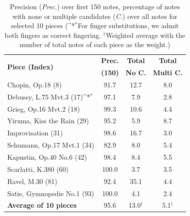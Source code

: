 \documentclass{article}
\begin{document}
\begin{table}
\def\sym#1{\ifmmode^{#1}\else\(^{#1}\)\fi}
\centering
\small

\begin{center}
\begin{tabular*}{\columnwidth}{l@{\extracolsep{\fill}}ccc}
\toprule
\multirow{2}{*}{\textbf{Piece (Index)}} &  \textbf{Prec.} & \textbf{Total}  & \textbf{Total} \\                                     &  \textbf{(150)} & \textbf{No C.} & \textbf{Multi C.}\\
\midrule
Chopin, Op.18 (8) &  91.7 & 12.7 & 8.0 \\
Debussy, L.75 Mvt.3 (17)\sym{*} & 97.1 & 7.9 & 2.8 \\
Grieg, Op.16 Mvt.2 (18) & 99.3 & 10.6 & 4.4 \\
Yiruma, Kiss the Rain (29) & 95.2 & 5.9 & 8.7 \\
Improvisation (31) & 98.6 & 16.7 & 3.0 \\
Schumann, Op.17 Mvt.1 (34) & 82.9 & 8.0 & 5.4 \\
Kapustin, Op.40 No.6 (42) & 98.4 & 8.4 & 5.5 \\
Scarlatti, K.380 (60) & 100.0 & 3.7 & 3.5 \\
Ravel, M.30 (81) & 92.4 & 35.1 & 4.4 \\
Satie, Gymnopedie No.1 (93) & 100.0 & 4.1 & 2.4 \\ 
\midrule
\textbf{Average of 10 pieces} & 95.6 & 13.0$^\dagger$ & 5.1$^\dagger$
\\
\bottomrule
\end{tabular*}
\caption{Precision (\textit{Prec.}) over first 150 notes, percentage of notes with none or multiple candidates (\textit{C.}) over all notes for selected 10 pieces (\sym{*}For finger substitutions, we admit both fingers as correct fingering. $^\dagger$Weighted average with the number of total notes of each piece as the weight.)}
\label{tab:fingering_results}
\end{center}
\end{table}
\end{document}
